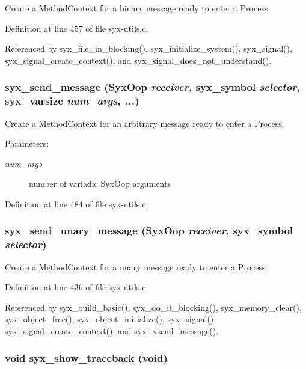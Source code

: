 Create a MethodContext for a binary message ready to enter a Process 

Definition at line 457 of file syx-utils.c.

Referenced by syx\_\-file\_\-in\_\-blocking(), syx\_\-initialize\_\-system(), syx\_\-signal(), syx\_\-signal\_\-create\_\-context(), and syx\_\-signal\_\-does\_\-not\_\-understand().\hypertarget{syx-utils_8c_afc33eb59faf7d968421f87303a86512}{
\subsubsection{ syx\_\-send\_\-message ({\bf SyxOop} {\em receiver}, \/  {\bf syx\_\-symbol} {\em selector}, \/  {\bf syx\_\-varsize} {\em num\_\-args}, \/   {\em ...})}}
\label{syx-utils_8c_afc33eb59faf7d968421f87303a86512}


Create a MethodContext for an arbitrary message ready to enter a Process.

\begin{Desc}
\item[Parameters:]
\begin{description}
\item[{\em num\_\-args}]number of variadic SyxOop arguments \end{description}
\end{Desc}


Definition at line 484 of file syx-utils.c.\hypertarget{syx-utils_8c_d3f4d38a5a1230e366dc21594ea28832}{
\subsubsection{ syx\_\-send\_\-unary\_\-message ({\bf SyxOop} {\em receiver}, \/  {\bf syx\_\-symbol} {\em selector})}}
\label{syx-utils_8c_d3f4d38a5a1230e366dc21594ea28832}


Create a MethodContext for a unary message ready to enter a Process 

Definition at line 436 of file syx-utils.c.

Referenced by syx\_\-build\_\-basic(), syx\_\-do\_\-it\_\-blocking(), syx\_\-memory\_\-clear(), syx\_\-object\_\-free(), syx\_\-object\_\-initialize(), syx\_\-signal(), syx\_\-signal\_\-create\_\-context(), and syx\_\-vsend\_\-message().\hypertarget{syx-utils_8c_30d1f880dd5a80049befd1dd2a95f0e7}{
\subsubsection{\setlength{\rightskip}{0pt plus 5cm}void syx\_\-show\_\-traceback (void)}}
\label{syx-utils_8c_30d1f880dd5a80049befd1dd2a95f0e7}


